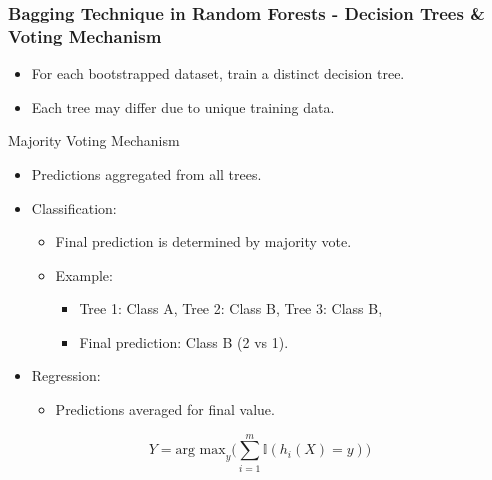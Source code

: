 \documentclass[aspectratio=169]{beamer}
\begin{document}
\begin{frame}[fragile]
    \frametitle{Bagging Technique in Random Forests - Decision Trees & Voting Mechanism}
    \begin{itemize}
        \item For each bootstrapped dataset, train a distinct decision tree.
        \item Each tree may differ due to unique training data.
    \end{itemize}
    
    \begin{block}{Majority Voting Mechanism}
        \begin{itemize}
            \item Predictions aggregated from all trees.
            \item Classification:
            \begin{itemize}
                \item Final prediction is determined by majority vote.
                \item Example: 
                \begin{itemize}
                    \item Tree 1: Class A, Tree 2: Class B, Tree 3: Class B,
                    \item Final prediction: Class B (2 vs 1).
                \end{itemize}
            \end{itemize}
            \item Regression:
            \begin{itemize}
                \item Predictions averaged for final value.
            \end{itemize}
        \end{itemize}
        
        \begin{equation}
        Y = \text{arg max}_{y} \bigg( \sum_{i=1}^{m} \mathbb{I}(h_i(X) = y) \bigg)
        \end{equation}
    \end{block}
\end{frame}
\end{document}
